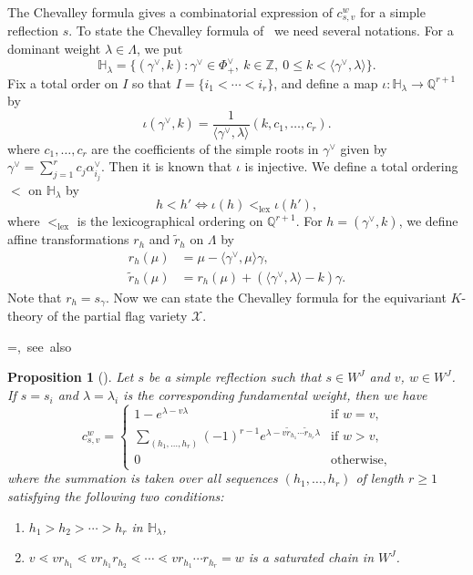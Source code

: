 \documentclass[10pt]{amsart}
\newtheorem{prop}[theo]{Proposition}
\theoremstyle{definition}
\theoremstyle{remark}
\newcommand\Int{\mathbb{Z}}
\newcommand\Rat{\mathbb{Q}}
\renewcommand\tilde{\widetilde}
\DeclareMathOperator{\lex}{lex}
\newcommand\XX{\mathcal{X}}
\begin{document}
The Chevalley formula gives a combinatorial expression of $c^w_{s,v}$ for a simple reflection $s$.
To state the Chevalley formula of~\cite{LS} we need several notations.
For a dominant weight $\lambda \in \Lambda$, we put
$$
\mathbb{H}_\lambda
 =
\{ (\gamma^\vee, k) : 
 \gamma^\vee \in \Phi^\vee_+, \ k \in \Int, \ 0 \le k < \langle \gamma^\vee, \lambda \rangle
\}.
$$
Fix a total order on $I$ so that $I = \{ i_1 < \cdots < i_r \}$, 
and define a map $\iota : \mathbb{H}_\lambda \to \Rat^{r+1}$ by
$$
\iota \left(\gamma^\vee , k \right)
 =
\frac{ 1 }
 { \langle \gamma^\vee, \lambda \rangle }
\left( k, c_1, \ldots, c_r \right).
$$
where $c_1, \dots, c_r$ are the coefficients of the simple roots in $\gamma^\vee$ 
given by $\gamma^\vee = \sum_{j=1}^r c_j \alpha^\vee_{i_j}$.
Then it is known that $\iota$ is injective.
We define a total ordering $<$ on $\mathbb{H}_\lambda$ by
$$
h < h' \Longleftrightarrow \iota(h) <_{\lex} \iota(h'),
$$
where $<_{\lex}$ is the lexicographical ordering on $\Rat^{r+1}$.
For $h = (\gamma^\vee, k)$, we define affine transformations $r_h$ and $\tilde{r}_h$ on $\Lambda$ by
\begin{align*}
r_h(\mu) &= \mu - \langle \gamma^\vee, \mu \rangle \gamma,
\\
\tilde{r}_h(\mu) &= r_h(\mu) + \left( \langle \gamma^\vee, \lambda \rangle - k \right) \gamma.
\end{align*}
Note that $r_h = s_{\gamma}$.
Now we can state the Chevalley formula for the equivariant $K$-theory of the partial flag variety $\XX$.

\setbox\toto=\hbox {\cite[Theorem~4.8~(4.12) and~(4.13)]{LS}, see also~\cite[Corollary~7.1]{LP}}
\begin{prop}[\box\toto]
\label{prop:Chevalley}
Let $s$ be a simple reflection such that $s \in W^J$ and $v$, $w \in W^J$.
If $s = s_i$ and $\lambda = \lambda_i$ is the corresponding fundamental weight, then we have
\begin{equation}
\label{eq:Chevalley}
c^w_{s,v}
 =
\begin{cases}
 1 - e^{\lambda - v \lambda} &\text{if $w=v$},
\\
 \displaystyle\sum_{(h_1, \ldots, h_r)}
 (-1)^{r-1}
 e^{\lambda - v \tilde{r}_{h_1} \cdots \tilde{r}_{h_r} \lambda}
 &\text{if $w > v$,}
\\
 0 &\text{otherwise,}
\end{cases}
\end{equation}
where the summation is taken over all sequences $(h_1, \ldots, h_r)$ of length $r \ge 1$ 
satisfying the following two conditions:
\begin{enumerate}[(H1)]
\item\label{prop4.6_H1} %
$h_1 > h_2 > \cdots > h_r$ in $\mathbb{H}_\lambda$,
\item\label{prop4.6_H2} %
$v \lessdot v r_{h_1} \lessdot v r_{h_1} r_{h_2} \lessdot \cdots \lessdot v r_{h_1} \cdots r_{h_r} = w$ 
is a saturated chain in $W^J$.
\end{enumerate}
\end{prop}
\end{document}
